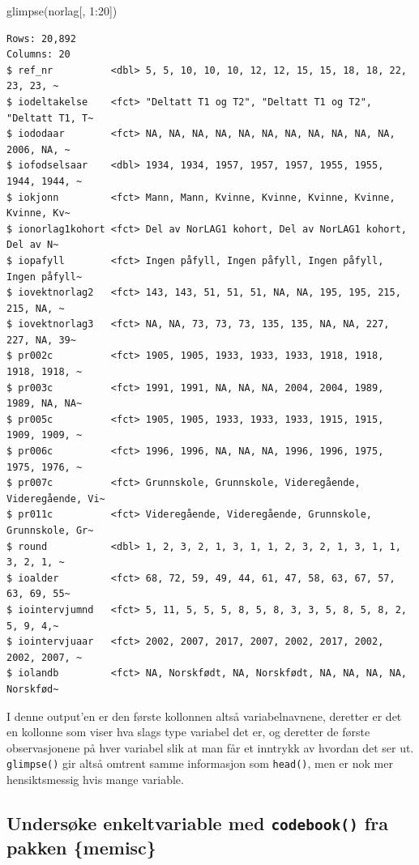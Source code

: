 \documentclass[
  letterpaper,
  DIV=11,
  numbers=noendperiod]{scrreprt}
\newenvironment{Shaded}{\begin{snugshade}}{\end{snugshade}}
\newcommand{\DecValTok}[1]{\textcolor[rgb]{0.68,0.00,0.00}{#1}}
\newcommand{\FunctionTok}[1]{\textcolor[rgb]{0.28,0.35,0.67}{#1}}
\newcommand{\NormalTok}[1]{\textcolor[rgb]{0.00,0.23,0.31}{#1}}
\newcommand{\SpecialCharTok}[1]{\textcolor[rgb]{0.37,0.37,0.37}{#1}}
\theoremstyle{definition}
\theoremstyle{remark}
\begin{document}
\begin{Shaded}
\begin{Highlighting}[]
\FunctionTok{glimpse}\NormalTok{(norlag[, }\DecValTok{1}\SpecialCharTok{:}\DecValTok{20}\NormalTok{])}
\end{Highlighting}
\end{Shaded}

\begin{verbatim}
Rows: 20,892
Columns: 20
$ ref_nr          <dbl> 5, 5, 10, 10, 10, 12, 12, 15, 15, 18, 18, 22, 23, 23, ~
$ iodeltakelse    <fct> "Deltatt T1 og T2", "Deltatt T1 og T2", "Deltatt T1, T~
$ iododaar        <fct> NA, NA, NA, NA, NA, NA, NA, NA, NA, NA, NA, 2006, NA, ~
$ iofodselsaar    <dbl> 1934, 1934, 1957, 1957, 1957, 1955, 1955, 1944, 1944, ~
$ iokjonn         <fct> Mann, Mann, Kvinne, Kvinne, Kvinne, Kvinne, Kvinne, Kv~
$ ionorlag1kohort <fct> Del av NorLAG1 kohort, Del av NorLAG1 kohort, Del av N~
$ iopafyll        <fct> Ingen påfyll, Ingen påfyll, Ingen påfyll, Ingen påfyll~
$ iovektnorlag2   <fct> 143, 143, 51, 51, 51, NA, NA, 195, 195, 215, 215, NA, ~
$ iovektnorlag3   <fct> NA, NA, 73, 73, 73, 135, 135, NA, NA, 227, 227, NA, 39~
$ pr002c          <fct> 1905, 1905, 1933, 1933, 1933, 1918, 1918, 1918, 1918, ~
$ pr003c          <fct> 1991, 1991, NA, NA, NA, 2004, 2004, 1989, 1989, NA, NA~
$ pr005c          <fct> 1905, 1905, 1933, 1933, 1933, 1915, 1915, 1909, 1909, ~
$ pr006c          <fct> 1996, 1996, NA, NA, NA, 1996, 1996, 1975, 1975, 1976, ~
$ pr007c          <fct> Grunnskole, Grunnskole, Videregående, Videregående, Vi~
$ pr011c          <fct> Videregående, Videregående, Grunnskole, Grunnskole, Gr~
$ round           <dbl> 1, 2, 3, 2, 1, 3, 1, 1, 2, 3, 2, 1, 3, 1, 1, 3, 2, 1, ~
$ ioalder         <fct> 68, 72, 59, 49, 44, 61, 47, 58, 63, 67, 57, 63, 69, 55~
$ iointervjumnd   <fct> 5, 11, 5, 5, 5, 8, 5, 8, 3, 3, 5, 8, 5, 8, 2, 5, 9, 4,~
$ iointervjuaar   <fct> 2002, 2007, 2017, 2007, 2002, 2017, 2002, 2002, 2007, ~
$ iolandb         <fct> NA, Norskfødt, NA, Norskfødt, NA, NA, NA, NA, Norskfød~
\end{verbatim}

I denne output'en er den første kollonnen altså variabelnavnene,
deretter er det en kollonne som viser hva slags type variabel det er, og
deretter de første observasjonene på hver variabel slik at man får et
inntrykk av hvordan det ser ut. \texttt{glimpse()} gir altså omtrent
samme informasjon som \texttt{head()}, men er nok mer hensiktsmessig
hvis mange variable.

\hypertarget{undersuxf8ke-enkeltvariable-med-codebook-fra-pakken-memisc}{%
\subsection{\texorpdfstring{Undersøke enkeltvariable med
\texttt{codebook()} fra pakken
\{memisc\}}{Undersøke enkeltvariable med codebook() fra pakken \{memisc\}}}\label{undersuxf8ke-enkeltvariable-med-codebook-fra-pakken-memisc}}
\end{document}
